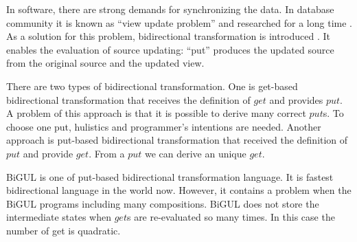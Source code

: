 \documentclass[runningheads]{llncs}
\begin{document}

In software, there are strong demands for synchronizing the data. In database community it is known as ``view update problem'' and researched for a long time \cite{}.
As a solution for this problem, bidirectional transformation is introduced \cite{}. It enables the evaluation of source updating: ``put'' produces the updated source from the original source and the updated view.

There are two types of bidirectional transformation. One is get-based bidirectional transformation \cite{} that receives the definition of $get$ and provides $put$. A problem of this approach is that it is possible to derive many correct $put$s. To choose one put, hulistics and programmer's intentions are needed. Another approach is put-based bidirectional transformation \cite{} that received the definition of $put$ and provide $get$. From a $put$ we can derive an unique $get$. 

BiGUL \cite{} is one of put-based bidirectional transformation language. It is fastest bidirectional language in the world now. However, it contains a problem when the BiGUL programs including many compositions. BiGUL does not store the intermediate states when $get$s are re-evaluated so many times. In this case the number of get is quadratic.

\vspace{5mm}
\end{document}
